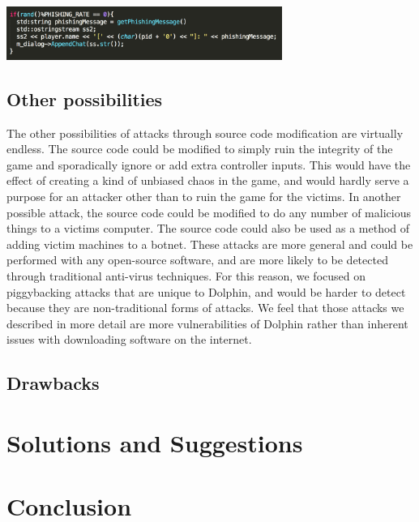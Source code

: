 \documentclass[conference]{IEEEtran}
\begin{document}
\vspace{0.5cm}
\begin{center}
\includegraphics[width=9cm]{Figures/Phishing2}
\end{center}
\vspace{0.5cm}

\subsection{Other possibilities}
The other possibilities of attacks through source code modification are virtually endless.
The source code could be modified to simply ruin the integrity of the game and sporadically ignore or add extra controller inputs.
This would have the effect of creating a kind of unbiased chaos in the game, and would hardly serve a purpose for an attacker other than to ruin the game for the victims.
In another possible attack, the source code could be modified to do any number of malicious things to a victims computer.
The source code could also be used as a method of adding victim machines to a botnet.
These attacks are more general and could be performed with any open-source software, and are more likely to be detected through traditional anti-virus techniques.
For this reason, we focused on piggybacking attacks that are unique to Dolphin, and would be harder to detect because they are non-traditional forms of attacks.
We feel that those attacks we described in more detail are more vulnerabilities of Dolphin rather than inherent issues with downloading software on the internet.
\subsection{Drawbacks}

\section{Solutions and Suggestions}

\section{Conclusion}




\end{document}
